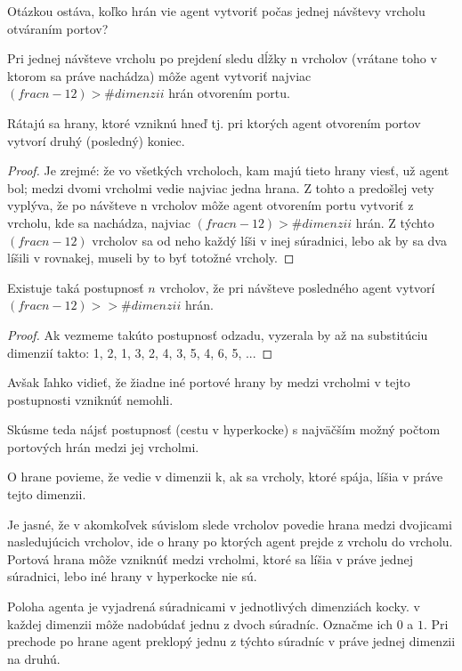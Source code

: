Otázkou ostáva, koľko hrán vie agent vytvoriť počas jednej návštevy vrcholu
otváraním portov? 
\begin{veta}
Pri jednej návšteve vrcholu po prejdení sledu dĺžky n vrcholov (vrátane toho
v ktorom sa práve nachádza) môže agent vytvoriť najviac 
$(frac{n-1}{2}) > \#dimenzii$
hrán otvorením portu.
\end{veta}
\begin{pozn}
Rátajú sa hrany, ktoré vzniknú hneď tj. pri ktorých agent otvorením portov
vytvorí druhý (posledný) koniec.
\end{pozn}
\begin{proof}
Je zrejmé: že vo všetkých vrcholoch, kam majú tieto hrany
viesť, už agent bol; medzi dvomi vrcholmi vedie najviac jedna hrana. Z tohto
a predošlej vety vyplýva, že po návšteve n vrcholov môže agent otvorením
portu vytvoriť z vrcholu, kde sa nachádza, najviac $(frac{n-1}{2}) > \#dimenzii$ hrán. Z
týchto $(frac{n-1}{2})$ vrcholov sa od neho každý líši v inej súradnici,
lebo ak by sa dva líšili v rovnakej, museli by to byť totožné vrcholy. 
\end{proof}
\begin{veta}
Existuje taká postupnosť $n$ vrcholov, že pri návšteve posledného agent
vytvorí $(frac{n-1}{2}) > >\#dimenzii$ hrán.
\end{veta}
\begin{proof}
Ak vezmeme takúto postupnosť odzadu, vyzerala by až na substitúciu dimenzií
takto: 1, 2, 1, 3, 2, 4, 3, 5, 4, 6, 5, ...
\end{proof}
\begin{pozn}
Avšak ľahko vidieť, že žiadne iné portové hrany by medzi vrcholmi v tejto
postupnosti vzniknúť nemohli.
\end{pozn}
Skúsme teda nájsť postupnosť (cestu v hyperkocke) s najväčším možný počtom 
portových hrán medzi jej vrcholmi.
\begin{ozn}
O hrane povieme, že vedie v dimenzii k, ak sa vrcholy, ktoré spája, líšia v
práve tejto dimenzii. 
\end{ozn}
Je jasné, že v akomkoľvek súvislom slede vrcholov povedie hrana
medzi dvojicami nasledujúcich vrcholov, ide o hrany po ktorých agent prejde
z vrcholu do vrcholu.
Portová hrana môže vzniknúť medzi vrcholmi, ktoré sa líšia v práve jednej
súradnici, lebo iné hrany v hyperkocke nie sú. 
\begin{ozn}
Poloha agenta je vyjadrená súradnicami v jednotlivých dimenziách kocky. v
každej dimenzii môže nadobúdať jednu z dvoch súradníc. Označme ich $0$ a $1$.
Pri prechode po hrane agent preklopý jednu z týchto súradníc v práve jednej
dimenzii na druhú.
\end{ozn}


